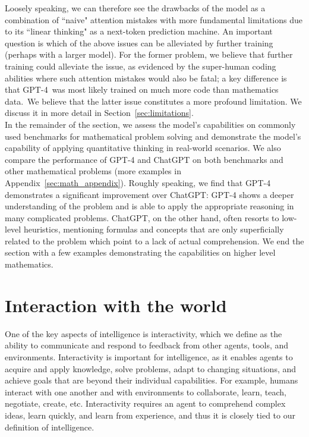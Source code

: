 Loosely speaking, we can therefore see the drawbacks of the model as a combination of ``naive" attention mistakes with more fundamental limitations due to its ``linear thinking" as a next-token prediction machine. An important question is which of the above issues can be alleviated by further training (perhaps with a larger model). For the former problem, we believe that further training could alleviate the issue, as evidenced by the super-human coding abilities where such attention mistakes would also be fatal; a key difference is that GPT-4\ was most likely trained on much more code than mathematics data. We believe that the latter issue constitutes a more profound limitation. We discuss it in more detail in Section~\ref{sec:limitations}. \\

In the remainder of the section, we assess the model's capabilities on commonly used benchmarks for mathematical problem solving and demonstrate the model's capability of applying quantitative thinking in real-world scenarios. We also compare the performance of {GPT-4} and ChatGPT on both benchmarks and other mathematical problems (more examples in Appendix~\ref{sec:math_appendix}). Roughly speaking, we find that {GPT-4} demonstrates a significant improvement over ChatGPT: {GPT-4} shows a deeper understanding of the problem and is able to apply the appropriate reasoning in many complicated problems. ChatGPT, on the other hand, often resorts to low-level heuristics, mentioning formulas and concepts that are only superficially related to the problem which point to a lack of actual comprehension. We end the section with a few examples demonstrating the capabilities on higher level mathematics.

\section{Interaction with the world}
\label{sec:environment1}
\label{sec:interact}

One of the key aspects of intelligence is interactivity, which we define as the ability to communicate and respond to feedback from other agents, tools, and environments. Interactivity is important for intelligence, as it enables agents to acquire and apply knowledge, solve problems, adapt to changing situations, and achieve goals that are beyond their individual capabilities. For example, humans interact with one another and with environments to collaborate, learn, teach, negotiate, create, etc. Interactivity requires an agent to comprehend complex ideas, learn quickly, and learn from experience, and thus it is closely tied to our definition of intelligence. 

